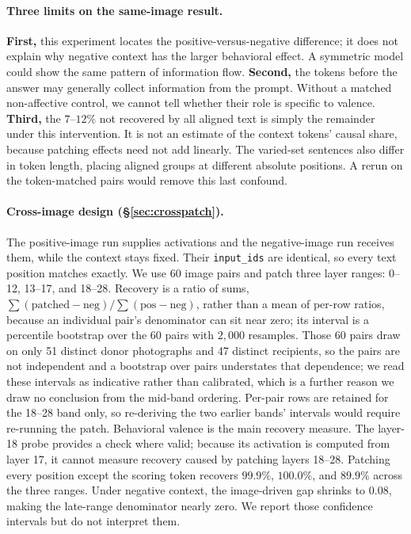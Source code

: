 \documentclass{article}
\begin{document}
\paragraph{Three limits on the same-image result.}
\textbf{First,} this experiment locates the positive-versus-negative difference; it does not explain why negative context has the larger behavioral effect. A symmetric model could show the same pattern of information flow. \textbf{Second,} the tokens before the answer may generally collect information from the prompt. Without a matched non-affective control, we cannot tell whether their role is specific to valence. \textbf{Third,} the $7$--$12\%$ not recovered by all aligned text is simply the remainder under this intervention. It is not an estimate of the context tokens' causal share, because patching effects need not add linearly. The varied-set sentences also differ in token length, placing aligned groups at different absolute positions. A rerun on the token-matched pairs would remove this last confound.

\paragraph{Cross-image design (\S\ref{sec:crosspatch}).}
The positive-image run supplies activations and the negative-image run receives them, while the context stays fixed. Their \texttt{input\_ids} are identical, so every text position matches exactly. We use 60 image pairs and patch three layer ranges: 0--12, 13--17, and 18--28. Recovery is a ratio of sums, $\sum(\text{patched} - \text{neg}) / \sum(\text{pos} - \text{neg})$, rather than a mean of per-row ratios, because an individual pair's denominator can sit near zero; its interval is a percentile bootstrap over the 60 pairs with $2{,}000$ resamples. Those 60 pairs draw on only 51 distinct donor photographs and 47 distinct recipients, so the pairs are not independent and a bootstrap over pairs understates that dependence; we read these intervals as indicative rather than calibrated, which is a further reason we draw no conclusion from the mid-band ordering. Per-pair rows are retained for the 18--28 band only, so re-deriving the two earlier bands' intervals would require re-running the patch. Behavioral valence is the main recovery measure. The layer-18 probe provides a check where valid; because its activation is computed from layer 17, it cannot measure recovery caused by patching layers 18--28. Patching every position except the scoring token recovers $99.9\%$, $100.0\%$, and $89.9\%$ across the three ranges. Under negative context, the image-driven gap shrinks to $0.08$, making the late-range denominator nearly zero. We report those confidence intervals but do not interpret them.
\end{document}
